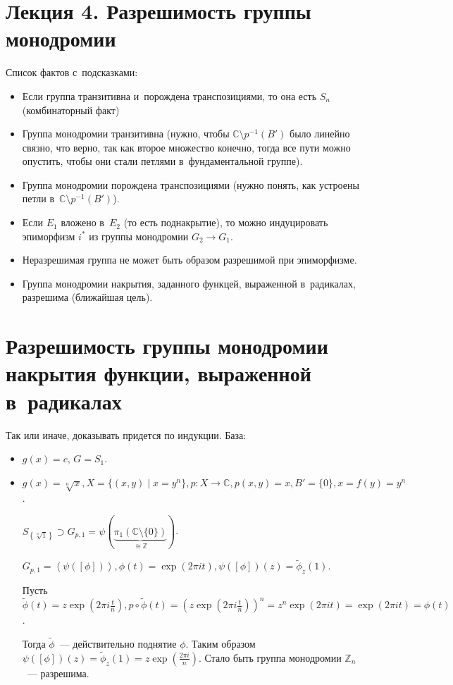 \documentclass{article}
\begin{document}
\section*{Лекция 4. Разрешимость группы монодромии}

\resetcntrs

Список фактов с~подсказками:
\begin{itemize}
	\item Если группа транзитивна и~порождена транспозициями, то она есть $S_n$
		(комбинаторный факт)
	\item Группа монодромии транзитивна (нужно, чтобы $\mathbb{C} \setminus
		p^{-1}(B')$ было линейно связно, что верно, так как второе множество
		конечно, тогда все пути можно опустить, чтобы они стали петлями
		в~фундаментальной группе).
	\item Группа монодромии порождена транспозициями (нужно понять, как устроены
		петли в~$\mathbb{C} \setminus p^{-1}(B')$).
	\item Если $E_1$ вложено в~$E_2$ (то есть поднакрытие), то можно индуцировать
		эпиморфизм $i^\ast$ из группы монодромии $G_2 \rightarrow G_1$.
	\item Неразрешимая группа не может быть образом разрешимой при эпиморфизме.
	\item Группа монодромии накрытия, заданного функцей, выраженной в~радикалах,
		разрешима (ближайшая цель).
\end{itemize}

\section{Разрешимость группы монодромии накрытия функции, выраженной
в~радикалах}

Так или иначе, доказывать придется по индукции. База:
\begin{itemize}
	\item $g(x) = c$, $G = S_1$.
	\item $g(x) = \sqrt[n]{x}, X = \{(x, y) \mid x = y^n \}, p: X \rightarrow
		\mathbb{C}, p(x, y) = x, B' = \{0\}, x = f(y) = y^n$.

		$S_{\left\{\sqrt[n]{1}\right\}} \supset G_{p,1} =
		\psi(\underbrace{\pi_1(\mathbb{C} \setminus \{0\})}_{\cong \mathbb{Z}}
		)$.

		$G_{p,1} = \left< \psi([\phi]) \right>, \phi(t) = \exp(2\pi it),
		\psi([\phi])(z) = \widetilde{\phi}_z(1)$.

		Пусть $\widetilde{\phi}(t) =
		z\exp(2\pi i \frac{t}{n}), p \circ \widetilde{\phi}(t) = (z \exp(2\pi i
		\frac{t}{n}))^n = z^n \exp(2\pi it) = \exp(2\pi it) = \phi(t)$.

		Тогда $\widetilde{\phi}$~--- действительно поднятие $\phi$. Таким образом
		$\psi([\phi])(z) = \widetilde{\phi}_z(1) = z \exp(\frac{2\pi i}{n})$. Стало
		быть группа монодромии $\mathbb{Z}_n$~--- разрешима.
\end{itemize}
\end{document}
